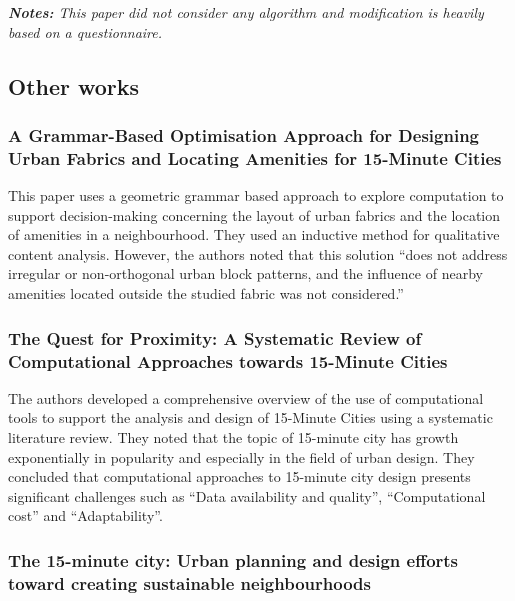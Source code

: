 \textit{\textbf{Notes:} This paper did not consider any algorithm and modification is heavily based on a questionnaire.}

\subsection{Other works}

\subsubsection{A Grammar-Based Optimisation Approach for Designing Urban Fabrics and Locating Amenities for 15-Minute Cities \texorpdfstring{\cite{lima_grammar-based_2022}}{}} \label{lima_grammar-based_2022}

This paper uses a geometric grammar based approach to explore computation to support decision-making concerning the layout of urban fabrics and the location of amenities in a neighbourhood. They used an inductive method for qualitative content analysis. However, the authors noted that this solution “does not address irregular or non-orthogonal urban block patterns, and the influence of nearby amenities located outside the studied fabric was not considered.”

\subsubsection{The Quest for Proximity: A Systematic Review of Computational Approaches towards 15-Minute Cities \texorpdfstring{\cite{lima_quest_2023}}{}} \label{lima_quest_2023}

The authors developed a comprehensive overview of the use of computational tools to support the analysis and design of 15-Minute Cities using a systematic literature review. They noted that the topic of 15-minute city has growth exponentially in popularity and especially in the field of urban design. They concluded that computational approaches to 15-minute city design presents significant challenges such as “Data availability and quality”, “Computational cost” and “Adaptability”.

\subsubsection{The 15-minute city: Urban planning and design efforts toward creating sustainable neighbourhoods \texorpdfstring{\cite{khavarian-garmsir_15-minute_2023}}{}} \label{khavarian-garmsir_15-minute_2023}

